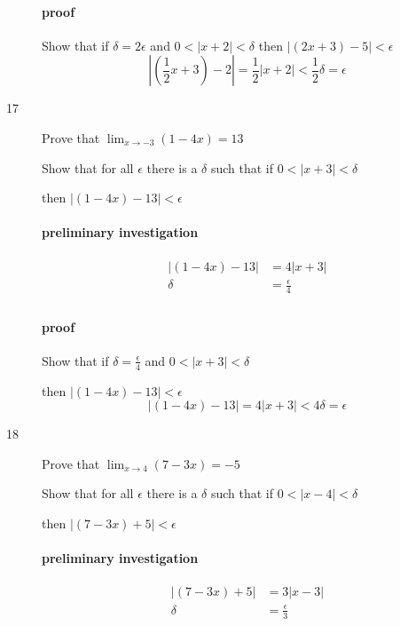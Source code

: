 \documentclass[letterpaper, landscape]{exam}
\begin{document}
\begin{description}
        \paragraph{proof}
        Show that if $\delta = 2 \epsilon$ and $0 < |x + 2| < \delta$
        then $|(2x + 3) - 5| < \epsilon$
        \[
          \left| \left( \frac{1}{2} x + 3 \right) - 2 \right| = \frac{1}{2} |x + 2| < \frac{1}{2} \delta = \epsilon
        \]

      \item[17] Prove that $\lim_{x \to -3} ( 1 - 4x ) = 13$

        Show that for all $\epsilon$ there is a $\delta$ such that if 
        $0 < |x + 3| < \delta$ 
        
        then $ | (1 - 4x) - 13 | < \epsilon$

        \paragraph{preliminary investigation}
        \begin{align*}
          | (1 - 4x) - 13 | & = 4 |x + 3| \\
          \delta         & = \frac{\epsilon}{4} \\
        \end{align*}

        \paragraph{proof}
        Show that if $\delta = \frac{\epsilon}{4}$ and $0 < |x + 3| < \delta$

        then $|(1 - 4x) - 13| < \epsilon$
        \[
          |(1 - 4x) - 13| = 4 |x + 3| < 4 \delta = \epsilon
        \]

      \item[18] Prove that $\lim_{x \to 4} ( 7 - 3x ) = -5$

        Show that for all $\epsilon$ there is a $\delta$ such that if 
        $0 < |x - 4| < \delta$ 
        
        then $ | (7 - 3x) + 5 | < \epsilon$

        \paragraph{preliminary investigation}
        \begin{align*}
          | (7 - 3x) + 5 | & = 3 |x - 3| \\
          \delta         & = \frac{\epsilon}{3} \\
        \end{align*}


\end{description}
\end{document}

